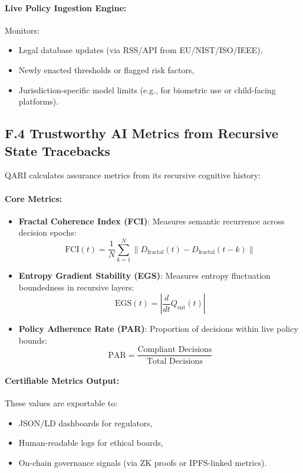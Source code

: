\documentclass[12pt]{article}
\begin{document}
\begin{itemize}
\paragraph{Live Policy Ingestion Engine:}
Monitors:
\begin{itemize}
    \item Legal database updates (via RSS/API from EU/NIST/ISO/IEEE),
    \item Newly enacted thresholds or flagged risk factors,
    \item Jurisdiction-specific model limits (e.g., for biometric use or child-facing platforms).
\end{itemize}

\subsection*{F.4 Trustworthy AI Metrics from Recursive State Tracebacks}

QARI calculates assurance metrics from its recursive cognitive history:

\paragraph{Core Metrics:}

\begin{itemize}
    \item \textbf{Fractal Coherence Index (FCI)}: Measures semantic recurrence across decision epochs:
    \[
    \text{FCI}(t) = \frac{1}{N} \sum_{k=1}^{N} \| D_{\text{fractal}}(t) - D_{\text{fractal}}(t-k) \|
    \]

    \item \textbf{Entropy Gradient Stability (EGS)}: Measures entropy fluctuation boundedness in recursive layers:
    \[
    \text{EGS}(t) = \left| \frac{d}{dt} Q_{\text{ent}}(t) \right|
    \]

    \item \textbf{Policy Adherence Rate (PAR)}: Proportion of decisions within live policy bounds:
    \[
    \text{PAR} = \frac{\text{Compliant Decisions}}{\text{Total Decisions}}
    \]
\end{itemize}

\paragraph{Certifiable Metrics Output:}
These values are exportable to:
\begin{itemize}
    \item JSON/LD dashboards for regulators,
    \item Human-readable logs for ethical boards,
    \item On-chain governance signals (via ZK proofs or IPFS-linked metrics).
\end{itemize}


\end{itemize}
\end{document}

